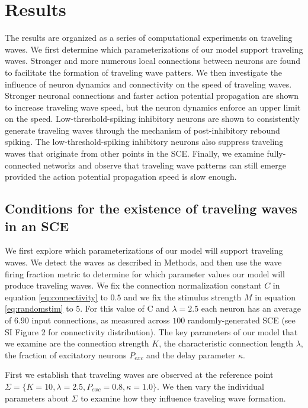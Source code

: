 \documentclass[12pt]{article}
\begin{document}
\section{Results}
The results are organized as a series of computational experiments on traveling waves.
We first determine which parameterizations of our model support traveling waves.
Stronger and more numerous local connections between neurons are found to facilitate the formation of traveling wave patters.
We then investigate the influence of neuron dynamics and connectivity on the speed of traveling waves.
Stronger neuronal connections and faster action potential propagation are shown to increase traveling wave speed, but the neuron dynamics enforce an upper limit on the speed. 
Low-threshold-spiking inhibitory neurons are shown to consistently generate traveling waves through the mechanism of post-inhibitory rebound spiking.
The low-threshold-spiking inhibitory neurons also suppress traveling waves that originate from other points in the SCE.
Finally, we examine fully-connected networks and observe that traveling wave patterns can still emerge provided the action potential propagation speed is slow enough.

\subsection{Conditions for the existence of traveling waves in an SCE} \label{sub:waves}
We first explore which parameterizations of our model will support traveling waves.
We detect the waves as described in Methods, and then use the wave firing fraction metric to determine for which parameter values our model will produce traveling waves.
We fix the connection normalization constant $C$ in equation \ref{eq:connectivity} to $0.5$ and we fix the stimulus strength $M$ in equation \ref{eq:randomstim} to $5$.
\color{red}
For this value of C and $\lambda=2.5$ each neuron has an average of $6.90$ input connections, as measured across $100$ randomly-generated SCE (see SI Figure 2 for connectivity distribution).
\color{black}
The key parameters of our model that we examine are the connection strength $K$, the characteristic connection length $\lambda$, the fraction of excitatory neurons $P_{exc}$ and the delay parameter $\kappa$.

First we establish that traveling waves are observed at the \color{red}reference \color{black} point $\Sigma = \{K=10,\lambda=2.5,P_{exc}=0.8,\kappa=1.0 \}$.
We then vary the individual parameters about $\Sigma$ to examine how they influence traveling wave formation.
\end{document}
